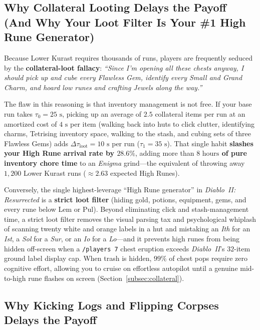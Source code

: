 \documentclass[11pt,reqno]{amsart}
\theoremstyle{definition}
\begin{document}
\subsection{Why Collateral Looting Delays the Payoff (And Why Your Loot Filter Is Your \#1 High Rune Generator)}

Because Lower Kurast requires thousands of runs, players are frequently seduced by the \textbf{collateral-loot fallacy}: \emph{``Since I'm opening all these chests anyway, I should pick up and cube every Flawless Gem, identify every Small and Grand Charm, and hoard low runes and crafting Jewels along the way.''}

The flaw in this reasoning is that inventory management is not free. If your base run takes $\tau_0 = 25\text{ s}$, picking up an average of $2.5$ collateral items per run at an amortized cost of $4\text{ s}$ per item (walking back into huts to click clutter, identifying charms, Tetrising inventory space, walking to the stash, and cubing sets of three Flawless Gems) adds $\Delta\tau_{\text{loot}} = 10\text{ s}$ per run ($\tau_1 = 35\text{ s}$). That single habit \textbf{slashes your High Rune arrival rate by $28.6\%$}, adding more than \textbf{$8\text{ hours}$ of pure inventory chore time} to an \emph{Enigma} grind—the equivalent of throwing away $1{,}200$ Lower Kurast runs ($\approx 2.63$ expected High Runes).

Conversely, the single highest-leverage ``High Rune generator'' in \emph{Diablo~II: Resurrected} is a \textbf{strict loot filter} (hiding gold, potions, equipment, gems, and every rune below Lem or Pul). Beyond eliminating click and stash-management time, a strict loot filter removes the visual parsing tax and psychological whiplash of scanning twenty white and orange labels in a hut and mistaking an \emph{Ith} for an \emph{Ist}, a \emph{Sol} for a \emph{Sur}, or an \emph{Io} for a \emph{Lo}—and it prevents high runes from being hidden off-screen when a \texttt{/players~7} chest eruption exceeds \emph{Diablo~II}'s $32$-item ground label display cap. When trash is hidden, $99\%$ of chest pops require zero cognitive effort, allowing you to cruise on effortless autopilot until a genuine mid-to-high rune flashes on screen (Section~\ref{subsec:collateral}).

\subsection{Why Kicking Logs and Flipping Corpses Delays the Payoff}
\end{document}
